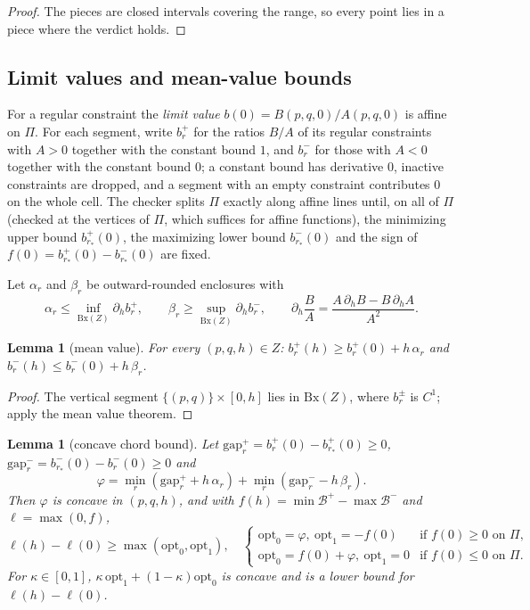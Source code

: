 \documentclass[11pt]{amsart}
\newtheorem{lemma}[theorem]{Lemma}
\theoremstyle{definition}
\theoremstyle{remark}
\newcommand{\gap}{\mathrm{gap}}
\newcommand{\opt}{\mathrm{opt}}
\newcommand{\Bx}{\mathrm{Bx}}
\begin{document}
\begin{proof}
The pieces are closed intervals covering the range, so every point lies in a piece where the verdict holds.
\end{proof}

\subsection{Limit values and mean-value bounds}
For a regular constraint the \emph{limit value} $b(0)=B(p,q,0)/A(p,q,0)$ is affine on $\Pi$. For each segment, write
$b_r^+$ for the ratios $B/A$ of its regular constraints with $A>0$ together with the constant bound $1$, and $b_r^-$
for those with $A<0$ together with the constant bound $0$; a constant bound has derivative $0$, inactive constraints
are dropped, and a segment with an empty constraint contributes $0$ on the whole cell. The checker splits $\Pi$ exactly along affine lines
until, on all of $\Pi$ (checked at the vertices of $\Pi$, which suffices for affine functions), the minimizing upper
bound $b^+_{r_*}(0)$, the maximizing lower bound $b^-_{r_*}(0)$ and the sign of $f(0)=b^+_{r_*}(0)-b^-_{r_*}(0)$ are fixed.

Let $\alpha_r$ and $\beta_r$ be outward-rounded enclosures with
\[
\alpha_r\le\inf_{\Bx(Z)}\partial_h b_r^+,\qquad \beta_r\ge\sup_{\Bx(Z)}\partial_h b_r^-,\qquad
\partial_h\frac BA=\frac{A\,\partial_hB-B\,\partial_hA}{A^2}.
\]

\begin{lemma}[mean value]\label{lem:mvt}
For every $(p,q,h)\in Z$: $b_r^+(h)\ge b_r^+(0)+h\,\alpha_r$ and $b_r^-(h)\le b_r^-(0)+h\,\beta_r$.
\end{lemma}

\begin{proof}
The vertical segment $\{(p,q)\}\times[0,h]$ lies in $\Bx(Z)$, where $b_r^\pm$ is $C^1$; apply the mean value
theorem.
\end{proof}

\begin{lemma}[concave chord bound]\label{lem:concave}
Let $\gap^+_r=b_r^+(0)-b_{r_*}^+(0)\ge0$, $\gap^-_r=b_{r_*}^-(0)-b_r^-(0)\ge0$ and
\[
\varphi=\min_r(\gap^+_r+h\,\alpha_r)+\min_r(\gap^-_r-h\,\beta_r).
\]
Then $\varphi$ is concave in $(p,q,h)$, and with $f(h)=\min\mathcal B^+-\max\mathcal B^-$ and $\ell=\max(0,f)$,
\[
\ell(h)-\ell(0)\ge\max(\opt_0,\opt_1),\quad
\begin{cases}\opt_0=\varphi,\ \opt_1=-f(0)&\text{if }f(0)\ge0\text{ on }\Pi,\\
\opt_0=f(0)+\varphi,\ \opt_1=0&\text{if }f(0)\le0\text{ on }\Pi.\end{cases}
\]
For $\kappa\in[0,1]$, $\kappa\,\opt_1+(1-\kappa)\opt_0$ is concave and is a lower bound for $\ell(h)-\ell(0)$.
\end{lemma}
\end{document}
